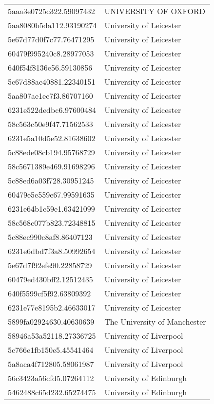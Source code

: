 \begin{tabular}{ll}
5aaa3e0725c322.59097432 & UNIVERSITY OF OXFORD \\
5aa8080b5da112.93190274 & University of Leicester \\
5e67d77d0f7c77.76471295 & University of Leicester \\
60479f995240c8.28977053 & University of Leicester \\
640f54f8136e56.59130856 & University of Leicester \\
5e67d88ae40881.22340151 & University of Leicester \\
5aa807ae1ec7f3.86707160 & University of Leicester \\
6231e522dedbc6.97600484 & University of Leicester \\
58c563c50e9f47.71562533 & University of Leicester \\
6231e5a10d5e52.81638602 & University of Leicester \\
5c88ede08cb194.95768729 & University of Leicester \\
58c5671389e469.91698296 & University of Leicester \\
5c88ed6a03f728.30951245 & University of Leicester \\
60479e5e559e67.99591635 & University of Leicester \\
6231e64b1e59e1.63421099 & University of Leicester \\
58c568c077b823.72348815 & University of Leicester \\
5c88ec990c8af8.86407123 & University of Leicester \\
6231e6dbd7f3a8.50992654 & University of Leicester \\
5e67d7f92efe90.22858729 & University of Leicester \\
60479ed430bff2.12512435 & University of Leicester \\
640f5599cf5f92.63809392 & University of Leicester \\
6231e77e8195b2.46633017 & University of Leicester \\
5899fa02924630.40630639 & The University of Manchester \\
58946a53a52118.27336725 & University of Liverpool \\
5c766e1fb150e5.45541464 & University of Liverpool \\
5a8aca4f712805.58061987 & University of Liverpool \\
56c3423a56cfd5.07264112 & University of Edinburgh \\
5462488c65d232.65274475 & University of Edinburgh \\

\end{tabular}
